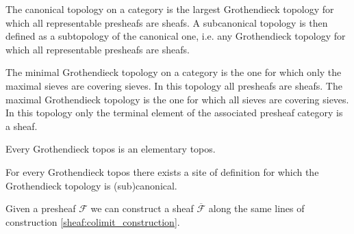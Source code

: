     \begin{example}
        The canonical topology on a category is the largest Grothendieck topology for which all representable presheafs are sheafs. A subcanonical topology is then defined as a subtopology of the canonical one, i.e. any Grothendieck topology for which all representable presheafs are sheafs.
    \end{example}
    \begin{example}
        The minimal Grothendieck topology on a category is the one for which only the maximal sieves are covering sieves. In this topology all presheafs are sheafs. The maximal Grothendieck topology is the one for which all sieves are covering sieves. In this topology only the terminal element of the associated presheaf category is a sheaf.
    \end{example}

    \begin{property}
        Every Grothendieck topos is an elementary topos.
    \end{property}

    \begin{property}
        For every Grothendieck topos there exists a site of definition for which the Grothendieck topology is (sub)canonical.
    \end{property}

    \begin{construct}[Sheafification]
        Given a presheaf $\mathcal{F}$ we can construct a sheaf $\overline{\mathcal{F}}$ along the same lines of construction \ref{sheaf:colimit_construction}.
    \end{construct}


